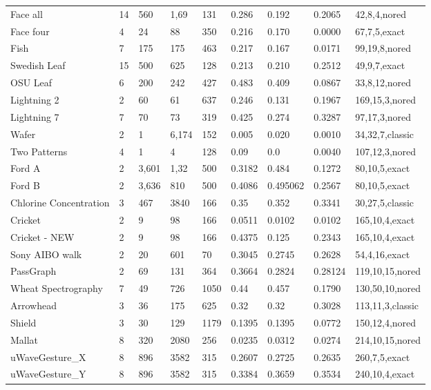 \begin{table}[t!]
{{\begin{tabularx}{\linewidth}{@{} l *7X @{} l}
Face all & 14 & 560 & 1,69 & 131 & 0.286 & 0.192 & 0.2065 & 42,8,4,nored \\
Face four & 4 & 24 & 88 & 350 & 0.216 & 0.170 & 0.0000 & 67,7,5,exact \\
Fish & 7 & 175 & 175 & 463 & 0.217 & 0.167 & 0.0171 & 99,19,8,nored \\
Swedish Leaf & 15 & 500 & 625 & 128 & 0.213 & 0.210 & 0.2512 & 49,9,7,exact \\
OSU Leaf & 6 & 200 & 242 & 427 & 0.483 & 0.409 & 0.0867 & 33,8,12,nored \\
Lightning 2 & 2 & 60 & 61 & 637 & 0.246 & 0.131 & 0.1967 & 169,15,3,nored \\
Lightning 7 & 7 & 70 & 73 & 319 & 0.425 & 0.274 & 0.3287 & 97,17,3,nored \\
Wafer & 2 & 1 & 6,174 & 152 & 0.005 & 0.020 & 0.0010 & 34,32,7,classic \\
Two Patterns & 4 & 1 & 4 & 128 & 0.09 & 0.0 & 0.0040 & 107,12,3,nored \\
Ford A & 2 & 3,601 & 1,32 & 500 & 0.3182 & 0.484 & 0.1272 & 80,10,5,exact \\
Ford B & 2 & 3,636 & 810 & 500 & 0.4086 & 0.495062 & 0.2567 & 80,10,5,exact \\
Chlorine Concentration & 3 & 467 & 3840 & 166 & 0.35 & 0.352 & 0.3341 & 30,27,5,classic \\
Cricket & 2 & 9 & 98 & 166 & 0.0511 & 0.0102 & 0.0102 & 165,10,4,exact \\
Cricket - NEW & 2 & 9 & 98 & 166 & 0.4375 & 0.125 & 0.2343 & 165,10,4,exact \\
Sony AIBO walk & 2 & 20 & 601 & 70 & 0.3045 & 0.2745 & 0.2628 & 54,4,16,exact \\
PassGraph & 2 & 69 & 131 & 364 & 0.3664 & 0.2824 & 0.28124 & 119,10,15,nored \\
Wheat Spectrography & 7 & 49 & 726 & 1050 & 0.44 & 0.457 & 0.1790 & 130,50,10,nored \\
Arrowhead & 3 & 36 & 175 & 625 & 0.32 & 0.32 & 0.3028 & 113,11,3,classic \\
Shield & 3 & 30 & 129 & 1179 & 0.1395 & 0.1395 & 0.0772 & 150,12,4,nored \\
Mallat & 8 & 320 & 2080 & 256 & 0.0235 & 0.0312 & 0.0274 & 214,10,15,nored \\ 
uWaveGesture\_X & 8 & 896 & 3582 & 315 & 0.2607 & 0.2725 & 0.2635 & 260,7,5,exact \\
uWaveGesture\_Y & 8 & 896 & 3582 & 315 & 0.3384 & 0.3659 & 0.3534 & 240,10,4,exact \\

\end{tabularx}}}
\end{table}
